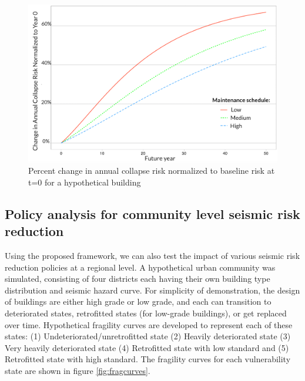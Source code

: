\begin{figure}[htbp!]
  \centering
  \includegraphics[width=\linewidth]{Figures/building_level.png}
  \caption{Percent change in annual collapse risk normalized to baseline risk at t=0 for a hypothetical building}
  \label{fig:bldglevel}
\end{figure}  




\subsection{Policy analysis for community level seismic risk reduction}




Using the proposed framework, we can also test the impact of various seismic risk reduction policies at a regional level. A hypothetical urban community was simulated, consisting of four districts each having their own building type distribution and seismic hazard curve. For simplicity of demonstration, the design of buildings are either high grade or low grade, and each can transition to deteriorated states, retrofitted states (for low-grade buildings), or get replaced over time. Hypothetical fragility curves are developed to represent each of these states: (1) Undeteriorated/unretrofitted state (2) Heavily deteriorated state (3) Very heavily deteriorated state (4) Retrofitted state with low standard and (5) Retrofitted state with high standard. The fragility curves for each vulnerability state are shown in figure \ref{fig:fragcurves}.

